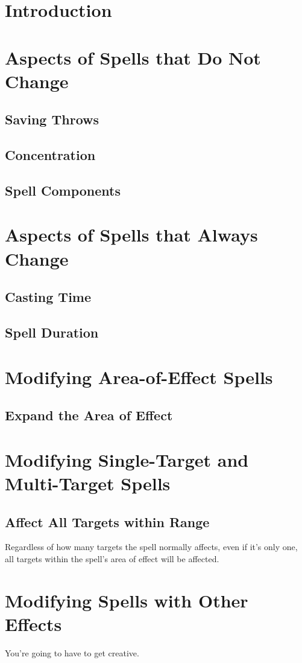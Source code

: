 \section{Introduction}

\section{Aspects of Spells that Do Not Change}

\subsection{Saving Throws}

\subsection{Concentration}

\subsection{Spell Components}

\section{Aspects of Spells that Always Change}

\subsection{Casting Time}

\subsection{Spell Duration}

\section{Modifying Area-of-Effect Spells}

\subsection{Expand the Area of Effect}

\section{Modifying Single-Target and Multi-Target Spells}

\subsection{Affect All Targets within Range}

Regardless of how many targets the spell normally affects, even if it's only one, all targets within the spell's area of effect will be affected.

\section{Modifying Spells with Other Effects}

You're going to have to get creative.
